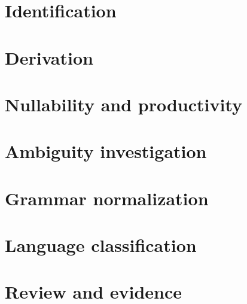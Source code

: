 \documentclass[11pt,letterpaper]{article}
\begin{document}
\makedoctitle\makedocsummary
\section{Identification}
\section{Derivation}
\section{Nullability and productivity}
\section{Ambiguity investigation}
\section{Grammar normalization}
\section{Language classification}
\section{Review and evidence}
\end{document}
